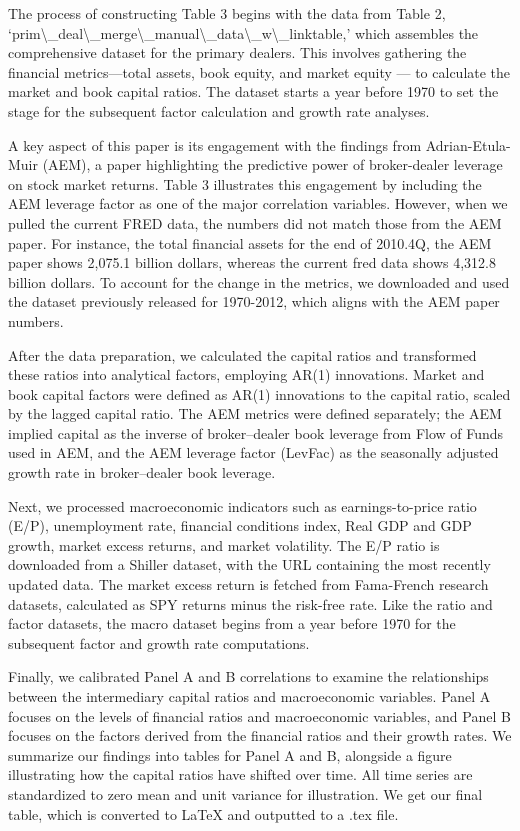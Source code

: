\documentclass{article}
\begin{document}
The process of constructing Table 3 begins with the data from Table 2, ‘prim\textbackslash{}_deal\textbackslash{}_merge\textbackslash{}_manual\textbackslash{}_data\textbackslash{}_w\textbackslash{}_linktable,’ which assembles the comprehensive dataset for the primary dealers. This involves gathering the financial metrics—total assets, book equity, and market equity — to calculate the market and book capital ratios.  The dataset starts a year before 1970 to set the stage for the subsequent factor calculation and growth rate analyses.

A key aspect of this paper is its engagement with the findings from Adrian-Etula-Muir (AEM), a paper highlighting the predictive power of broker-dealer leverage on stock market returns. Table 3 illustrates this engagement by including the AEM leverage factor as one of the major correlation variables. However, when we pulled the current FRED data, the numbers did not match those from the AEM paper. For instance, the total financial assets for the end of 2010.4Q, the AEM paper shows 2,075.1 billion dollars, whereas the current fred data shows 4,312.8 billion dollars. To account for the change in the metrics, we downloaded and used the dataset previously released for 1970-2012, which aligns with the AEM paper numbers.

After the data preparation, we calculated the capital ratios and transformed these ratios into analytical factors, employing AR(1) innovations. Market and book capital factors were defined as AR(1) innovations to the capital ratio, scaled by the lagged capital ratio. The AEM metrics were defined separately; the AEM implied capital as the inverse of broker–dealer book leverage from Flow of Funds used in AEM, and the AEM leverage factor (LevFac) as the seasonally adjusted growth rate in broker–dealer book leverage. 

Next, we processed macroeconomic indicators such as earnings-to-price ratio (E/P), unemployment rate, financial conditions index, Real GDP and GDP growth, market excess returns, and market volatility. The E/P ratio is downloaded from a Shiller dataset, with the URL containing the most recently updated data. The market excess return is fetched from Fama-French research datasets, calculated as SPY returns minus the risk-free rate. Like the ratio and factor datasets, the macro dataset begins from a year before 1970 for the subsequent factor and growth rate computations. 

Finally, we calibrated Panel A and B correlations to examine the relationships between the intermediary capital ratios and macroeconomic variables. Panel A focuses on the levels of financial ratios and macroeconomic variables, and Panel B focuses on the factors derived from the financial ratios and their growth rates. We summarize our findings into tables for Panel A and B, alongside a figure illustrating how the capital ratios have shifted over time. All time series are standardized to zero mean and unit variance for illustration. We get our final table, which is converted to LaTeX and outputted to a .tex file.
\end{document}
